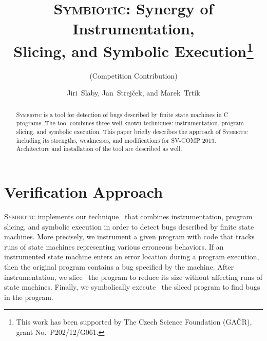 \documentclass[10pt]{llncs}
\newcommand\tool{\textsc{Symbiotic}\xspace}
\begin{document}

\title{\tool: Synergy of Instrumentation,\\ Slicing, and Symbolic
  Execution\thanks{This work has been supported by The Czech Science
    Foundation (GA\v{C}R), grant No.~P202/12/G061.}}
\subtitle{(Competition Contribution)}
\author{Jiri~Slaby, Jan~Strej\v{c}ek, and Marek~Trt\'{i}k}

\maketitle

\begin{abstract}
  \tool is a tool for detection of bugs described by finite state machines
  in C programs. The tool combines three well-known techniques:
  instrumentation, program slicing, and symbolic execution.  This paper
  briefly describes the approach of \tool including its strengths,
  weaknesses, and modifications for SV-COMP 2013. Architecture and
  installation of the tool are described as well.
\end{abstract}



\section{Verification Approach}
\label{sec:approach}

\tool implements our technique~\cite{sse} that combines instrumentation,
program slicing, and symbolic execution in order to detect bugs described by
finite state machines. More precisely, we instrument a given program with
code that tracks runs of state machines representing various erroneous
behaviors. If an instrumented state machine enters an error location during
a program execution, then the original program contains a bug specified by
the machine. After instrumentation, we slice~\cite{weiser} the program to
reduce its size without affecting runs of state machines. Finally, we
symbolically execute~\cite{king} the sliced program to find bugs in the
program.
\end{document}
